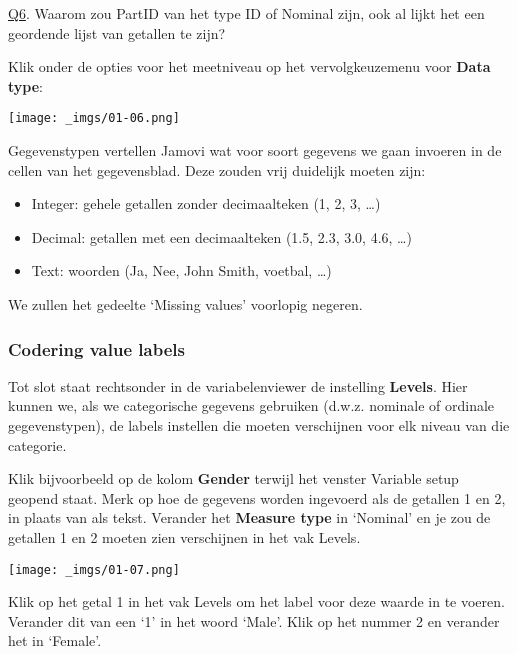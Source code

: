 \documentclass[
  letterpaper,
  DIV=11,
  numbers=noendperiod]{scrartcl}
\providecommand{\tightlist}{%
  \setlength{\itemsep}{0pt}\setlength{\parskip}{0pt}}\usepackage{longtable,booktabs,array}
\begin{document}
\begin{tcolorbox}[beforeafter skip=1cm, ignore nobreak=true, breakable, colframe=Questions-frame, colback=Questions-bg, coltext=Questions-text, boxsep=2mm, arc=0mm, boxrule=0.5mm]

\protect\hypertarget{Q6}{\protect\hyperlink{A6}{Q6}}. Waarom zou PartID
van het type ID of Nominal zijn, ook al lijkt het een geordende lijst
van getallen te zijn?

\end{tcolorbox}

Klik onder de opties voor het meetniveau op het vervolgkeuzemenu voor
\textbf{Data type}:

\texttt{[image: \_imgs/01-06.png]}

Gegevenstypen vertellen Jamovi wat voor soort gegevens we gaan invoeren
in de cellen van het gegevensblad. Deze zouden vrij duidelijk moeten
zijn:

\begin{itemize}
\tightlist
\item
  Integer: gehele getallen zonder decimaalteken (1, 2, 3, \ldots)
\item
  Decimal: getallen met een decimaalteken (1.5, 2.3, 3.0, 4.6, \ldots)
\item
  Text: woorden (Ja, Nee, John Smith, voetbal, \ldots)
\end{itemize}

We zullen het gedeelte `Missing values' voorlopig negeren.

\hypertarget{codering-value-labels}{%
\subsubsection{Codering value labels}\label{codering-value-labels}}

Tot slot staat rechtsonder in de variabelenviewer de instelling
\textbf{Levels}. Hier kunnen we, als we categorische gegevens gebruiken
(d.w.z. nominale of ordinale gegevenstypen), de labels instellen die
moeten verschijnen voor elk niveau van die categorie.

Klik bijvoorbeeld op de kolom \textbf{Gender} terwijl het venster
Variable setup geopend staat. Merk op hoe de gegevens worden ingevoerd
als de getallen 1 en 2, in plaats van als tekst. Verander het
\textbf{Measure type} in `Nominal' en je zou de getallen 1 en 2 moeten
zien verschijnen in het vak Levels.

\texttt{[image: \_imgs/01-07.png]}

Klik op het getal 1 in het vak Levels om het label voor deze waarde in
te voeren. Verander dit van een `1' in het woord `Male'. Klik op het
nummer 2 en verander het in `Female'.
\end{document}
